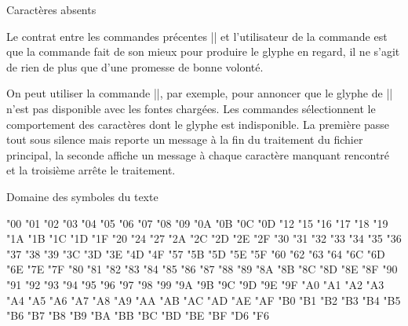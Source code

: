 \formalpar Caractères absents

Le contrat entre les commandes précentes |\tlwhatever| et
l'utilisateur de la commande est que la commande fait de son mieux
pour produire le glyphe en regard, il ne s'agit de rien de plus que
d'une promesse de bonne volonté.

On peut utiliser la commande |\missingchardef\tlthorn|, par exemple, pour
annoncer que le glyphe de |\tlthorn| n'est pas disponible avec les
fontes chargées. Les commandes
\begincode
\missingcharhush
\missingcharverbose
\missingcharstop
\endcode
sélectionnent le comportement des caractères dont le glyphe est
indisponible. La première passe tout sous silence mais reporte un
message à la fin du traitement du fichier principal, la seconde
affiche un message à chaque caractère manquant rencontré et la
troisième arrête le traitement.


\formalpar Domaine des symboles du texte

\def\tsfontselect{\fontselect}
\begindomaintable\tsfontselect
"00 \tsgrave
"01 \tsacute
"02 \tscircumflex
"03 \tstilde
"04 \tsdieresis
"05 \tshungarumlaut
"06 \tsring
"07 \tscaron
"08 \tsbreve
"09 \tsmacron
"0A \tsdotaccent
"0B \tscedilla
"0C \tsogonek
"0D \tsquotebase
"12 \tsdblquotebase
"15 \tstwelveudash
"16 \tsthreequartersemdash
"17 \tscwmcapital
"18 \tsarrowleft
"19 \tsarrowright
"1A \tstieaccentlowercase
"1B \tstieaccentcapital
"1C \tstieaccentlowercasenew
"1D \tstieaccentcapitalnew
"1F \tscwmascender
"20 \tsblanksymbol
"24 \tsdollar
"27 \tsquotesingle
"2A \tsasteriskmath
"2C \tscomma
"2D \tshyphendbl
"2E \tsperiod
"2F \tsfraction
"30 \tszerooldstyle
"31 \tsoneoldstyle
"32 \tstwooldstyle
"33 \tsthreeoldstyle
"34 \tsfouroldstyle
"35 \tsfiveoldstyle
"36 \tssixoldstyle
"37 \tssevenoldstyle
"38 \tseightoldstyle
"39 \tsnineoldstyle
"3C \tsangleleft
"3D \tsminus
"3E \tsangleright
"4D \tsmho
"4F \tsbigcircle
"57 \tsohm
"5B \tsdblbracketleft
"5D \tsdblbracketright
"5E \tsarrowup
"5F \tsarrowdown
"60 \tsgrave
"62 \tsborn
"63 \tsdivorced
"64 \tsdied
"6C \tsleaf
"6D \tsmarried
"6E \tsmusicalnote
"7E \tstildelow
"7F \tsvarhyphendbl
"80 \tsbreve
"81 \tscaron
"82 \tshungarumlaut
"83 \tsdblgrave
"84 \tsdagger
"85 \tsdaggerdbl
"86 \tsdblverticalbar
"87 \tsperthousand
"88 \tsbullet
"89 \tscentigrade
"8A \tsdollaroldstyle
"8B \tscentoldstyle
"8C \tsflorin
"8D \tscolonmonetary
"8E \tswon
"8F \tsnaira
"90 \tsguarani
"91 \tspeso
"92 \tslira
"93 \tsrecipe
"94 \tsinterrobang
"95 \tsgnaborretni
"96 \tsdong
"97 \tstrademark
"98 \tspermyriad
"99 \tsvarparagraph
"9A \tsbaht
"9B \tsnumero
"9C \tsdiscount
"9D \tsestimated
"9E \tsopenbullet
"9F \tsservicemark
"A0 \tsquillbracketleft
"A1 \tsquillbracketright
"A2 \tscent
"A3 \tssterling
"A4 \tscurrency
"A5 \tsyen
"A6 \tsbrokenbar
"A7 \tssection
"A8 \tsdieresis
"A9 \tscopyright
"AA \tsordfeminine
"AB \tscopyleft
"AC \tslogicalnot
"AD \tspublished
"AE \tsregistered
"AF \tsmacron
"B0 \tsdegree
"B1 \tsplusminus
"B2 \tstwosuperior
"B3 \tsthreesuperior
"B4 \tsacute
"B5 \tsmu
"B6 \tsparagraph
"B7 \tsperiodcentered
"B8 \tsreferencemark
"B9 \tsonesuperior
"BA \tsordmasculine
"BB \tsradical
"BC \tsonequarter
"BD \tsonehalf
"BE \tsthreequarters
"BF \tseuro
"D6 \tsmultiply
"F6 \tsdivide
\enddomaintable


